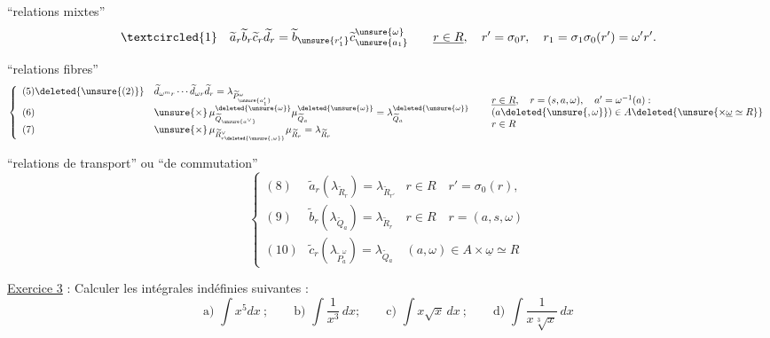 
``relations mixtes''
\[
\textcircled{1}\quad
\widetilde a_r\widetilde b_r\widetilde c_r\widetilde d_r
=\widetilde b_{\unsure{r_1'}}\widetilde c_{\unsure{a_1}}^{\unsure{\omega}}
\qquad
\underline{r\in R},\quad r'=\sigma_0r,\quad
r_1=\sigma_1\sigma_0(r')=\omega'r'.
\]

``relations fibres''
\[
\left\{\begin{array}{ll}
(5)\deleted{\unsure{(2)}}&\widetilde d_{\omega^m r}\cdots\widetilde d_{\omega r}\widetilde d_r=\lambda_{\widetilde P_{\unsure{a'_1}}^\omega}\\
(6)&\unsure{\times}\,\mu_{\widetilde Q_{\unsure{a^\vee}}}^{\deleted{\unsure{\omega}}}\mu_{\widetilde Q_a}^{\deleted{\unsure{\omega}}}=\lambda_{\widetilde Q_a}^{\deleted{\unsure{\omega}}}\\
(7)&\unsure{\times}\,\mu_{\widetilde R_{r\deleted{\unsure{,\omega}}}^\vee}\mu_{\widetilde R_r}=\lambda_{\widetilde R_r}
\end{array}\right.
\quad
\begin{array}{l}
\underline{r\in R},\quad r=(s,a,\omega),\quad a'=\omega^{-1}(a):\\
(a\deleted{\unsure{,\omega}})\in A\deleted{\unsure{\times\underline\omega\simeq R}}\\
r\in R
\end{array}
\]

``relations de transport'' ou ``de commutation''
\[
\left\{\begin{array}{lll}
(8)&\widetilde a_r(\lambda_{\widetilde R_r})=\lambda_{\widetilde R_{r'}}&r\in R\quad r'=\sigma_0(r),\\
(9)&\widetilde b_r(\lambda_{\widetilde Q_a})=\lambda_{\widetilde R_r}&r\in R\quad r=(a,s,\omega)\\
(10)&\widetilde c_r(\lambda_{\widetilde P_a^\omega})=\lambda_{\widetilde Q_a}&(a,\omega)\in A\times\underline\omega\simeq R
\end{array}\right.
\]

\uline{Exercice 3} : Calculer les intégrales indéfinies suivantes :
\[
\text{a) }\int x^5 dx\ ;\qquad
\text{b) }\int\frac1{x^3}\,dx;\qquad
\text{c) }\int x\sqrt{x}\,dx\ ;\qquad
\text{d) }\int\frac1{x\sqrt[3]{x}}\,dx
\]

